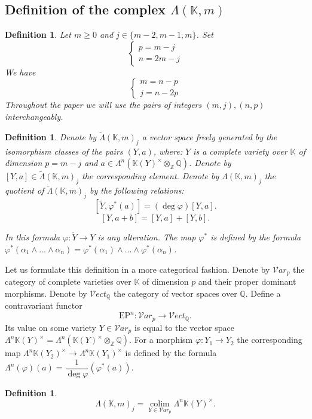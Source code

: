 \documentclass[12pt]{extarticle}
\newtheorem{definition}[theorem]{Definition}
\def\mb{\mathbb}
\def\mc{\mathcal}
\def\L{\Lambda}
\def\k{\mb K}
\def\Z{\mb Z}
\def\Q{\mb Q}
\def\ph{\varphi}
\def\t{\times}
\def\cl{\colon}
\def\wt{\widetilde}
\def\wdw{\wedge\dots\wedge}
\newcommand{\EP}[2]{{\Lambda^{#1}\k(#2)^\times}}
\DeclareMathOperator*{\colim}{colim}
\begin{document}
\subsection{Definition of the complex $\Lambda(\k, m)$}
\label{sub:sec:Lambda_definition}
\begin{definition}
    Let $m\geq 0$ and $j\in\{m-2,m-1,m\}$. Set 
    \begin{equation*}
        \begin{cases}
            p=m-j\\ n=2m-j
        \end{cases}
    \end{equation*}
We have
\begin{equation*}
 \begin{cases}
            m=n-p\\ j=n-2p
        \end{cases}
        \end{equation*}
    Throughout the paper we will use the pairs of integers $(m,j), (n, p)$ interchangeably.
    \end{definition}
    \begin{definition} 
    Denote by $\wt\L(\k, m)_j$ a vector space freely generated by  the isomorphism classes of the pairs $(Y, a)$, where: $Y$ is a complete variety over $\k$ of dimension $p=m-j$ and $a\in\Lambda^n(\k(Y)^\t\otimes_\Z\Q)$. Denote by $[Y,a]\in\wt\L(\k,m)_j$ the corresponding element.
Denote by $\L(\k, m)_j$ the quotient of $\wt\L(\k, m)_j$ by the following relations:
$$[\wt Y,\ph^*(a)]=(\deg\ph)[Y,a].$$
$$[Y,a+b]=[Y, a] + [Y, b].$$

In this formula $\ph\colon \wt Y\to Y$ is any alteration. The map $\ph^*$ is defined by the formula
$\ph^*(\alpha_1\wdw \alpha_n)=\ph^*(\alpha_1)\wdw \ph^*(\alpha_n)$. 
\end{definition}
Let us formulate this definition in a more categorical fashion. Denote by ${\mc Var}_{p}$ the category of complete varieties over $\k$ of dimension $p$ and their proper dominant morphisms. Denote by ${\mc Vect}_\Q$ the category of vector spaces over $\Q$. Define a contravariant functor $$\mathrm{EP}^n\cl {\mc Var}_{p}\to {\mc Vect}_\Q.$$ Its value on some variety $Y\in {\mc Var}_{p}$ is equal to the vector space $\EP{n}{Y}=\L^n(\k(Y)^\t\otimes_{\mb Z}{\mb Q})$. For a morphism $\varphi\colon Y_1\to Y_2$ the corresponding map $\EP{n}{Y_2}\to \EP{n}{Y_1}$ is defined by the formula $\Lambda^n(\varphi)(a)=\dfrac 1{\deg{\varphi}}(\ph^*(a))$.

\begin{definition}
    $$\L(\k, m)_j=\colim\limits_{Y\in {\mc Var}_{p}}\EP{n}{Y}.$$
\end{definition}
\end{document}
